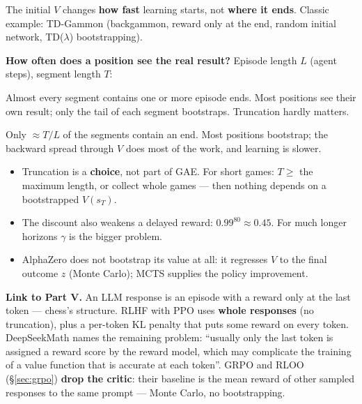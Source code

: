 \begin{keybox}
The initial $V$ changes \textbf{how fast} learning starts, not \textbf{where it ends}. Classic example: TD-Gammon (backgammon, reward only at the end, random initial network, TD($\lambda$) bootstrapping).
\end{keybox}

\textbf{How often does a position see the real result?} Episode length $L$ (agent steps), segment length $T$:

\begin{pair}
\begin{coolbox}[title={$T\ge L$ (chess: $T=2048$, $L\approx40$--$100$)}]
\small Almost every segment contains one or more episode ends. Most positions see their own result; only the tail of each segment bootstraps. Truncation hardly matters.
\end{coolbox}
\begin{warmbox}[title={$T\ll L$ (e.g.\ $T=128$, $L$ in the thousands)}]
\small Only $\approx T/L$ of the segments contain an end. Most positions bootstrap; the backward spread through $V$ does most of the work, and learning is slower.
\end{warmbox}
\end{pair}

\begin{warnbox}[title={Other options, and the discount}]
\begin{itemize}
  \item Truncation is a \textbf{choice}, not part of GAE. For short games: $T\ge$ the maximum length, or collect whole games --- then nothing depends on a bootstrapped $V(s_T)$.
  \item The discount also weakens a delayed reward: $0.99^{80}\approx0.45$. For much longer horizons $\gamma$ is the bigger problem.
  \item AlphaZero does not bootstrap its value at all: it regresses $V$ to the final outcome $z$ (Monte Carlo); MCTS supplies the policy improvement.
\end{itemize}
\end{warnbox}

\begin{notebox}
\textbf{Link to Part V.} An LLM response is an episode with a reward only at the last token --- chess's structure. RLHF with PPO uses \textbf{whole responses} (no truncation), plus a per-token KL penalty that puts some reward on every token. DeepSeekMath names the remaining problem: ``usually only the last token is assigned a reward score by the reward model, which may complicate the training of a value function that is accurate at each token''. GRPO and RLOO (\S\ref{sec:grpo}) \textbf{drop the critic}: their baseline is the mean reward of other sampled responses to the same prompt --- Monte Carlo, no bootstrapping.
\end{notebox}

